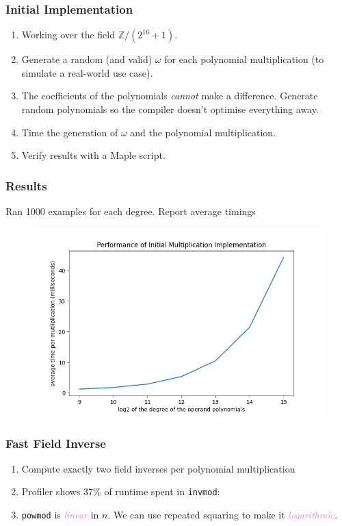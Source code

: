 \documentclass{beamer}
\newcommand{\its}[1]{\textcolor{violet}{\emph{#1}}}
\begin{document}
\begin{frame}
    \frametitle{Initial Implementation}

    \begin{enumerate}[label=(\roman*)]
        \item Working over the field $\mathbb{Z}/(2^{16} + 1)$. \pause
            \smallbreak
        \item Generate a random (and valid) $\omega$ for each polynomial
            multiplication (to simulate a real-world use case). \pause
            \smallbreak
        \item The coefficients of the polynomials \emph{cannot} make a
            difference. Generate random polynomials so the compiler doesn't
            optimise everything away. \pause \smallbreak
        \item Time the generation of $\omega$ and the polynomial multiplication.
            \pause \smallbreak
        \item Verify results with a Maple script.
    \end{enumerate}
\end{frame}

\begin{frame}
    \frametitle{Results}

    Ran 1000 examples for each degree. Report average timings

    \begin{figure}
        \includegraphics[width=\textwidth]{initial.png}
    \end{figure}
\end{frame}

\begin{frame}
    \frametitle{Fast Field Inverse}

    \begin{enumerate}[label=(\roman*)]
        \item Compute exactly two field inverses per polynomial multiplication
            \pause \smallbreak
        \item Profiler shows 37\% of runtime spent in \texttt{invmod}:
            
            \pause \smallbreak
        \item \texttt{powmod} is \its{linear} in $n$. \pause We can use repeated
            squaring to make it \its{logarithmic}.
    \end{enumerate}
\end{frame}
\end{document}
